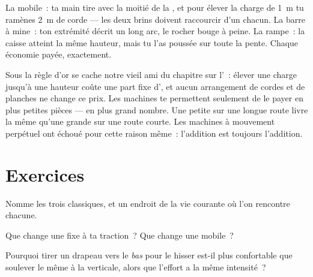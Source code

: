 \begin{example}\label{ex:g5:simple-machines:check}
La  mobile~: ta main tire avec la moitié de la , et pour
élever la charge de \qty{1}{m} tu ramènes \qty{2}{m} de corde --- les
deux brins doivent raccourcir d'un  chacun. La barre à mine~:
ton extrémité décrit un long arc, le rocher bouge à peine. La rampe~:
la caisse atteint la même hauteur, mais tu l'as poussée sur toute la
pente. Chaque économie payée, exactement.
\end{example}

\begin{remark}\label{rem:g5:simple-machines:whygolden}
Sous la règle d'or se cache notre vieil ami du chapitre sur
l'~: élever une charge jusqu'à une hauteur coûte une part
fixe d', et aucun arrangement de cordes et de planches ne
change ce prix. Les machines te permettent seulement de le payer en
plus petites pièces --- en plus grand nombre. Une petite  sur
une longue route livre la même  qu'une grande  sur une
route courte. Les machines à mouvement perpétuel ont échoué pour
cette raison même~: l'addition est toujours l'addition.
\end{remark}

\section{Exercices}

\begin{exercise}[$\star$]\label{exo:g5:simple-machines:1}
Nomme les trois  classiques, et un endroit de la vie
courante où l'on rencontre chacune.
\end{exercise}

\begin{exercise}[$\star$]\label{exo:g5:simple-machines:2}
Que change une  fixe à ta traction~? Que change une 
mobile~?
\end{exercise}

\begin{exercise}[$\star$]\label{exo:g5:simple-machines:3}
Pourquoi tirer un drapeau vers le \emph{bas} pour le hisser
est-il plus confortable que soulever le même  à la verticale,
alors que l'effort a la même intensité~?
\end{exercise}

